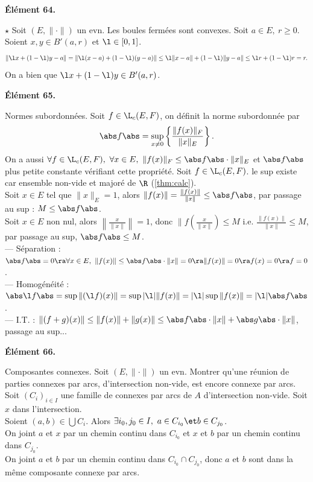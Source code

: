 \documentclass[11pt]{article}
\begin{document}
\vspace*{-0.4cm}

\bf{Élément 64.}

\begin{prop}{$\star$}{}
    Soit $(E,\|\cdot\|)$ un evn. Les boules fermées sont convexes.
    \tcblower
    Soit $a\in E, ~ r\geq 0$. Soient $x,y\in B'(a,r)$ et $\l\in[0,1]$.
    \begin{equation*}
        \| \l x + (1 - \l)y - a \| = \| \l(x-a) + (1-\l)(y-a) \| \leq \l\|x-a\| + (1-\l)\|y-a\| \leq \l r + (1-\l)r = r.
    \end{equation*}
    On a bien que $\l x + (1-\l)y \in B'(a,r)$.
\end{prop}

\bf{Élément 65.}

\begin{defi}{Normes subordonnées.}{}
    Soit $f\in\L_c(E,F)$, on définit la norme subordonnée par
    \begin{equation*}
        \abs f \abs = \sup_{x\neq0}\left\{\frac{\|f(x)\|_F}{\|x\|_E}\right\}.
    \end{equation*}
    On a aussi $\forall f \in \L_c(E,F), ~ \forall x \in E, ~ \|f(x)\|_F \leq \abs f \abs \cdot \|x\|_E$ et $\abs f \abs$ plus petite constante vérifiant cette propriété.
    \tcblower
    Soit $f\in\L_c(E,F)$. le sup existe car ensemble non-vide et majoré de $\R$ (\ref{thm:calc}).\\
    Soit $x\in E$ tel que $\|x\|_E=1$, alors $\|f(x)\|=\frac{\|f(x)\|}{\|x\|}\leq\abs f \abs$, par passage au sup : $M\leq \abs f \abs$.\\
    Soit $x\in E$ non nul, alors $\left\|\frac{x}{\|x\|}\right\|=1$, donc $\|f\left( \frac{x}{\|x\|}  \right) \leq M$ i.e. $\frac{\|f(x)\|}{\|x\|}\leq M$, par passage au sup, $\abs f \abs \leq M$.\\
    --- Séparation : $\abs f \abs = 0 \ra \forall x \in E, ~ \| f(x) \| \leq \abs f \abs\cdot\|x\|=0 \ra \|f(x)\|=0 \ra f(x)=0\ra f=0$.\\
    --- Homogénéité : $\abs \l f \abs = \sup \|(\l f)(x)\| = \sup |\l|\|f(x)\| = |\l| \sup \|f(x)\| = |\l| \abs f \abs$.\\
    --- I.T. : $\|(f+g)(x)\|\leq\|f(x)\|+\|g(x)\|\leq \abs f \abs\cdot\|x\| + \abs g \abs\cdot\|x\|$, passage au sup...
\end{defi}

\bf{Élément 66.}

\begin{ex}{Composantes connexes.}{}
    Soit $(E,\|\cdot\|)$ un evn. Montrer qu'une réunion de parties connexes par arcs, d'intersection non-vide, est encore connexe par arcs.
    \tcblower
     Soit $(C_i)_{i\in I}$ une famille de connexes par arcs de $A$ d'intersection non-vide. Soit $x$ dans l'intersection.\\
    Soient $(a,b)\in\bigcup C_i$. Alors $\exists i_0,j_0 \in I, ~ a\in C_{i_0} \et b\in C_{j_0}$.\\
    On joint $a$ et $x$ par un chemin continu dans $C_{i_0}$ et $x$ et $b$ par un chemin continu dans $C_{j_0}$.\\
    On joint $a$ et $b$ par un chemin continu dans $C_{i_0}\cap C_{j_0}$, donc $a$ et $b$ sont dans la même composante connexe par arcs.
\end{ex}
\end{document}
